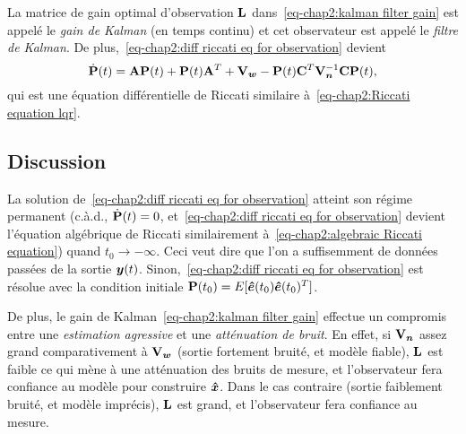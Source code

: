 La matrice de gain optimal d'observation  $\mathbf{L}$ dans~\eqref{eq-chap2:kalman filter gain} est appelé le \emph{gain de Kalman} (en temps continu) et cet observateur est appelé le \emph{filtre de Kalman}. De plus,~\eqref{eq-chap2:diff riccati eq for observation} devient 
\begin{equation}
	\dot{\mathbf{P}}(t) = \mathbf{A}\mathbf{P}(t) + \mathbf{P}(t)\mathbf{A}^T+\mathbf{V}_{\bm w}-\mathbf{P}(t)\mathbf{C}^T\mathbf{V}_{\bm n}^{-1}\mathbf{C}\mathbf{P}(t),
\end{equation}
qui est une équation différentielle de Riccati similaire à~\eqref{eq-chap2:Riccati equation lqr}. 
\subsection{Discussion}
La solution de~\eqref{eq-chap2:diff riccati eq for observation} atteint son régime permanent (c.à.d., $\dot{\mathbf{P}}(t)=0$, et~\eqref{eq-chap2:diff riccati eq for observation} devient l'équation algébrique de Riccati similairement à~\eqref{eq-chap2:algebraic Riccati equation}) quand $t_0\rightarrow-\infty$. Ceci veut dire que l'on a suffisemment de données passées de la sortie $\bm{y}(t)$. Sinon,~\eqref{eq-chap2:diff riccati eq for observation} est résolue avec la condition initiale $\mathbf{P}(t_0)=E[\bm{\hat{e}}(t_0)\bm{\hat{e}}(t_0)^T]$.

De plus, le gain de Kalman~\eqref{eq-chap2:kalman filter gain} effectue un compromis entre une \emph{estimation agressive} et une \emph{atténuation de bruit}. En effet, si $\mathbf{V}_{\bm n}$ assez grand comparativement à $\mathbf{V}_{\bm w}$ (sortie fortement bruité, et modèle fiable), $\mathbf{L}$ est faible ce qui mène à une atténuation des bruits de mesure, et l'observateur fera confiance au modèle pour construire $\bm{\hat{x}}$. Dans le cas contraire (sortie faiblement bruité, et modèle imprécis),  $\mathbf{L}$ est grand, et l'observateur fera confiance au mesure.
